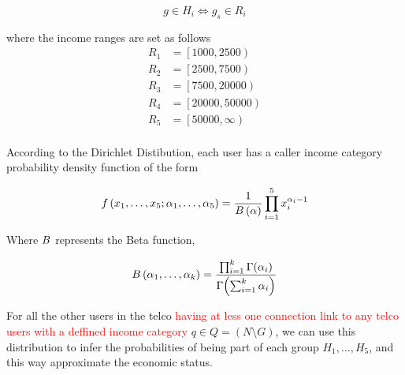 \[
	g \in H_i \iff g_s \in R_i
\]

where the income ranges are set as follows
\begin{align*}
	R_1 &= \left[1000, 2500\right) \\
	R_2 &= \left[2500, 7500\right) \\
	R_3 &= \left[7500, 20000\right) \\
	R_4 &= \left[20000, 50000\right) \\
	R_5 &= \left[50000, \infty\right) \\
\end{align*}


According to the Dirichlet Distibution, each user has a caller income category probability density function of the form

\[
f \left( x_1, \ldots, x_5; \alpha_1, \ldots, \alpha_5 \right) = \frac{1}{B \left( \alpha \right)} \prod^5_{i = 1} x_i^{\alpha_i - 1}
\]

Where $ B $ represents the Beta function,

\[
B \left( \alpha_1, \ldots, \alpha_k \right) = \frac{\prod^k_{i = 1} \Gamma \! \left( \alpha_i \right)}{\Gamma \! \left( \sum^k_{i = 1} \alpha_i \right) }
\]

For all the other users in the telco \textcolor{red}{having at less one connection link to any telco users with a deffined income category} $ q \in Q = (N \setminus G) $, we can use this distribution to infer the probabilities of being part of each group $ H_1, \ldots, H_5 $, and this way approximate the economic status.




